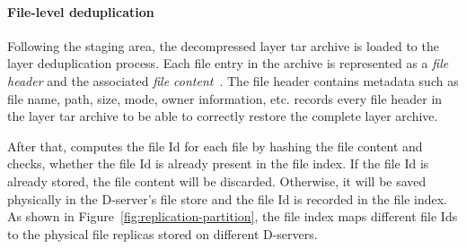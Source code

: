 %

%
\paragraph{File-level deduplication}
%
Following the staging area, 
the decompressed layer tar archive is loaded to the layer deduplication process.
Each file entry in the archive is represented as a \emph{file header} and the associated
\emph{file content}~\cite{basictar}.
The file header contains metadata such as file name, path, size, mode, owner information, etc.
%
%
\sysname records every file header in the layer tar archive
to be able to correctly restore the complete layer archive.
%

After that, \sysname computes the file Id for each file by hashing the file content and 
checks, whether the file Id is already present in the file index.
If the file Id is already stored, the file content will be discarded. 
Otherwise, it will be saved physically in the D-server's file store and 
the file Id is recorded in the file index. As shown in Figure~\ref{fig:replication-partition},
the file index maps different file Ids to the physical file replicas stored
on different D-servers.


